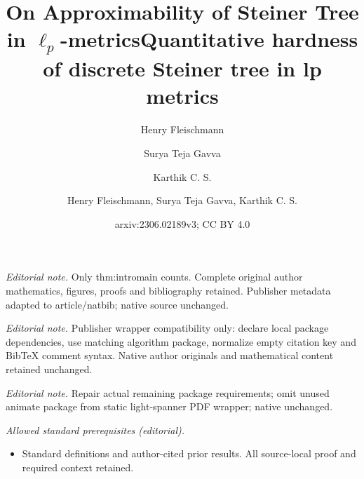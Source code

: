 \documentclass{article}\providecommand{\DeclareRedundantLanguages}[2]{}\usepackage[a4paper,margin=20mm]{geometry}
\title{On Approximability of Steiner Tree in \texorpdfstring{$\ell_p$}{lp}-metrics}
\author{Henry Fleischmann \and Surya Teja Gavva \and Karthik C. S.}\date{}
\title{Quantitative hardness of discrete Steiner tree in lp metrics}
\author{Henry Fleischmann, Surya Teja Gavva, Karthik C. S.}
\date{arxiv:2306.02189v3; CC BY 4.0}
\newcommand{\1}{\textbf{1}}
\begin{document}
\maketitle
\noindent\textit{Editorial note.} Only thm:intromain counts. Complete original author mathematics, figures, proofs and bibliography retained. Publisher metadata adapted to article/natbib; native source unchanged.\par\medskip
\noindent\textit{Editorial note.} Publisher wrapper compatibility only: declare local package dependencies, use matching algorithm package, normalize empty citation key and BibTeX comment syntax. Native author originals and mathematical content retained unchanged.\par\medskip
\noindent\textit{Editorial note.} Repair actual remaining package requirements; omit unused animate package from static light-spanner PDF wrapper; native unchanged.\par\medskip
\noindent\textit{Allowed standard prerequisites (editorial).}\begin{itemize}
\item Standard definitions and author-cited prior results. All source-local proof and required context retained.
\end{itemize}\medskip
\maketitle
\end{document}
